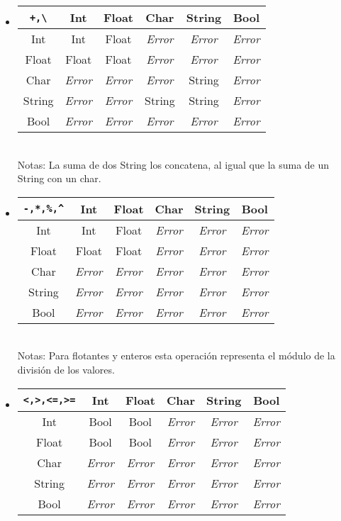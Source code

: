 \documentclass[12pt, spanish]{report}
\begin{document}
\begin{itemize}
\item
\begin{tabular}{|c||ccccc|}
	\hline
\texttt{+,\textbackslash}  &  Int  & Float & Char  & String & Bool  \\
	\hline \hline
Int    & Int          & Float        & \emph{Error} & \emph{Error} & \emph{Error} \\
Float  & Float        & Float        & \emph{Error} & \emph{Error} & \emph{Error}\\
Char   & \emph{Error} & \emph{Error} & \emph{Error} & String       & \emph{Error}\\
String & \emph{Error} & \emph{Error} & String       & String       & \emph{Error}\\
Bool   & \emph{Error} & \emph{Error} & \emph{Error} & \emph{Error} & \emph{Error}\\
	\hline
\end{tabular}\\

Notas: La suma de dos String los concatena, al igual que la suma de un String
con un char.

\item
\begin{tabular}{|c||ccccc|}
	\hline
\texttt{-,*,\%,\^}  &  Int  & Float & Char  & String & Bool  \\
	\hline \hline
Int    & Int   & Float & \emph{Error} & \emph{Error} & \emph{Error}\\
Float  & Float & Float & \emph{Error} & \emph{Error} & \emph{Error}\\
Char   & \emph{Error} & \emph{Error} & \emph{Error} & \emph{Error} & \emph{Error} \\
String & \emph{Error} & \emph{Error} & \emph{Error} & \emph{Error} & \emph{Error} \\
Bool   & \emph{Error} & \emph{Error} & \emph{Error} & \emph{Error} & \emph{Error} \\
	\hline
\end{tabular}\\

Notas: Para flotantes y enteros esta operaci\'on representa el m\'odulo de la
divisi\'on de los valores.\\

\item
\begin{tabular}{|c||ccccc|}
	\hline
\texttt{<,>,<=,>=}&  Int  & Float & Char & String & Bool  \\
	\hline \hline
Int      &  Bool &  Bool & \emph{Error} & \emph{Error} & \emph{Error}\\
Float    &  Bool &  Bool & \emph{Error} & \emph{Error} & \emph{Error}\\
Char     & \emph{Error} & \emph{Error} & \emph{Error} & \emph{Error} & \emph{Error} \\
String   & \emph{Error} & \emph{Error} & \emph{Error} & \emph{Error} & \emph{Error} \\
Bool     & \emph{Error} & \emph{Error} & \emph{Error} & \emph{Error} & \emph{Error} \\
	\hline
\end{tabular}


\end{itemize}
\end{document}
